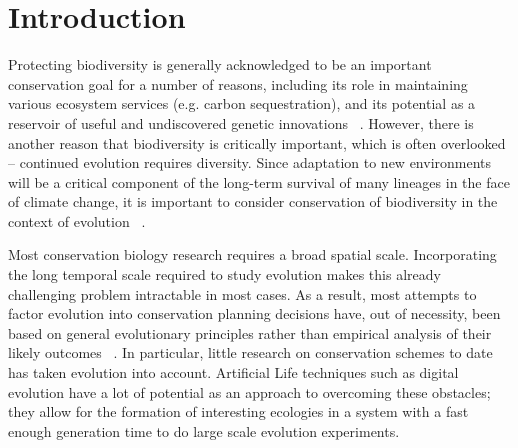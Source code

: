 \documentclass[letterpaper]{article}
\begin{document}
\begin{abstract}
%
%
%
%
\end{abstract}

\section{Introduction}

Protecting biodiversity is generally acknowledged to be an important conservation goal for a number of reasons, including its role in maintaining various ecosystem services (e.g. carbon sequestration), and its potential as a reservoir of useful and undiscovered genetic innovations ~\citep{gaston_biodiversity:_2004,hassan_ecosystems_2005,loreau_biodiversity_2001,montoya_emerging_2012}. However, there is another reason that biodiversity is critically important, which is often overlooked -- continued evolution requires diversity. Since adaptation to new environments will be a critical component of the long-term survival of many lineages in the face of climate change, it is important to consider conservation of biodiversity in the context of evolution ~\citep{cowling_rapid_2001,mace_evolutionary_2008,smith_prescriptive_2014}. 

	Most conservation biology research requires a broad spatial scale. Incorporating the long temporal scale required to study evolution makes this already challenging problem intractable in most cases. As a result, most attempts to factor evolution into conservation planning decisions have, out of necessity, been based on general evolutionary principles rather than empirical analysis of their likely outcomes  ~\citep{cowling_rapid_2001, sgro_building_2011, ferriere_evolutionary_2004}. In particular, little research on conservation schemes to date has taken evolution into account. Artificial Life techniques such as digital evolution have a lot of potential as an approach to overcoming these obstacles; they allow for the formation of interesting ecologies in a system with a fast enough generation time to do large scale evolution experiments.
    
\end{document}
